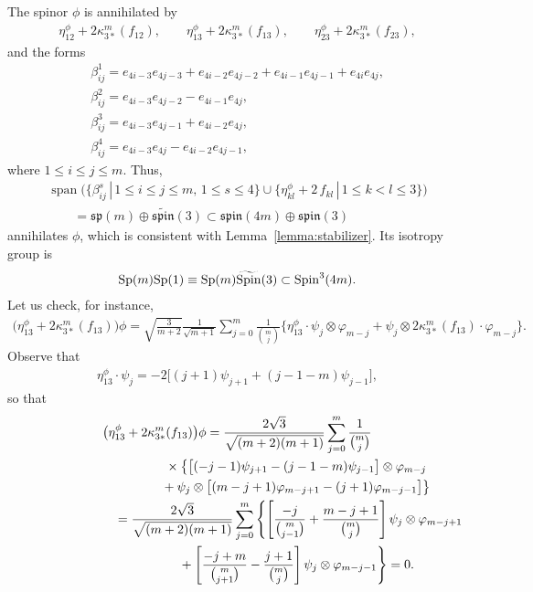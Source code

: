 \documentclass[pdftex]{sigma}
\numberwithin{equation}{section}
\begin{document}
The spinor $\phi$ is annihilated by
\begin{gather*}
 \eta_{12}^\phi + 2 \kappa_{3*}^m(f_{12}), \qquad
 \eta_{13}^\phi + 2 \kappa_{3*}^m(f_{13}), \qquad
 \eta_{23}^\phi + 2 \kappa_{3*}^m(f_{23}),
\end{gather*}
and the forms
\begin{gather*}
 \beta_{ij}^1 = e_{4i-3}e_{4j-3} + e_{4i-2}e_{4j-2} + e_{4i-1}e_{4j-1} + e_{4i}e_{4j}, \\
 \beta_{ij}^2 = e_{4i-3}e_{4j-2} - e_{4i-1}e_{4j}, \\
 \beta_{ij}^3 = e_{4i-3}e_{4j-1} + e_{4i-2}e_{4j}, \\
 \beta_{ij}^4 = e_{4i-3}e_{4j} - e_{4i-2}e_{4j-1},
\end{gather*}
where $1\leq i\leq j\leq m$. Thus,
\begin{gather*}\operatorname{span}\big( \big\{\beta_{ij}^s \,|\, 1\leq i\leq j\leq m, \,
1\leq s\leq 4\big\}\cup \big\{\eta_{kl}^\phi + 2\,f_{kl}\,|\, 1\leq k<l\leq 3\big\} \big) \\
\qquad {} = \mathfrak{sp}(m) \oplus \widetilde{\mathfrak{spin}}(3) \subset \mathfrak{spin}(4m)\oplus\mathfrak{spin}(3)\end{gather*}
annihilates $\phi$, which is consistent with Lemma~\ref{lemma:stabilizer}. Its isotropy group is
\begin{gather*}{\rm Sp}(m){\rm Sp}(1)\equiv {\rm Sp}(m)\widetilde{\rm Spin}(3)\subset {\rm Spin}^3(4m).\end{gather*}
Let us check, for instance,
\begin{gather*}
\big(\eta_{13}^{\phi}+2\kappa_{3\ast}^{m}(f_{13})\big)\phi
 = \sqrt{\frac{3}{m+2}}\frac{1}{\sqrt{m+1}}\!\sum_{j=0}^{m}\frac{1}{{m\choose
j}}\big \{ \eta_{13}^{\phi}\cdot\psi_j\otimes\varphi_{m-j} + \psi_{j}\otimes
2\kappa_{3\ast}^{m}(f_{13})\cdot\varphi_{m-j}\big \} .
\end{gather*}
Observe that
\begin{gather*}
\eta_{13}^{\phi}\cdot \psi_j = -2\big[(j+1)\psi_{j+1}+(j-1-m)\psi_{j-1}\big],
\end{gather*}
so that
\begin{gather*}
\big(\eta_{13}^{\phi}+2\kappa_{3\ast}^{m}(f_{13})\big)\phi =
 \frac{2\sqrt{3}}{\sqrt{(m+2)(m+1)}}\sum_{j=0}^{m}\frac{1}{{m\choose j}}\\
 \hphantom{\big(\eta_{13}^{\phi}+2\kappa_{3\ast}^{m}(f_{13})\big)\phi =}{}\times
 \big\{
 \big[ (-j-1)\psi_{j+1}-(j-1-m)\psi_{j-1}\big] \otimes\varphi_{m-j}\\
\hphantom{\big(\eta_{13}^{\phi}+2\kappa_{3\ast}^{m}(f_{13})\big)\phi =}{}
 + \psi_{j}\otimes \big[ (m-j+1)\varphi_{m-j+1} -(j+1)\varphi_{m-j-1}\big] \big \} \\
\hphantom{\big(\eta_{13}^{\phi}+2\kappa_{3\ast}^{m}(f_{13})\big)\phi}{}
 =
 \frac{2\sqrt{3}}{\sqrt{(m+2)(m+1)}}\sum_{j=0}^{m}\left\{ \left[\frac{-j}{{m\choose
j-1}}+\frac{m-j+1}{{m\choose j}}\right] \psi_{j}\otimes \varphi_{m-j+1}\right.\\
\left.\hphantom{\big(\eta_{13}^{\phi}+2\kappa_{3\ast}^{m}(f_{13})\big)\phi=}{}
 +\left[ \frac{-j+m}{{m\choose j+1}}-\frac{j+1}{{m\choose j}}\right] \psi_{j}\otimes \varphi_{m-j-1}\right\} = 0.
\end{gather*}
\end{document}
